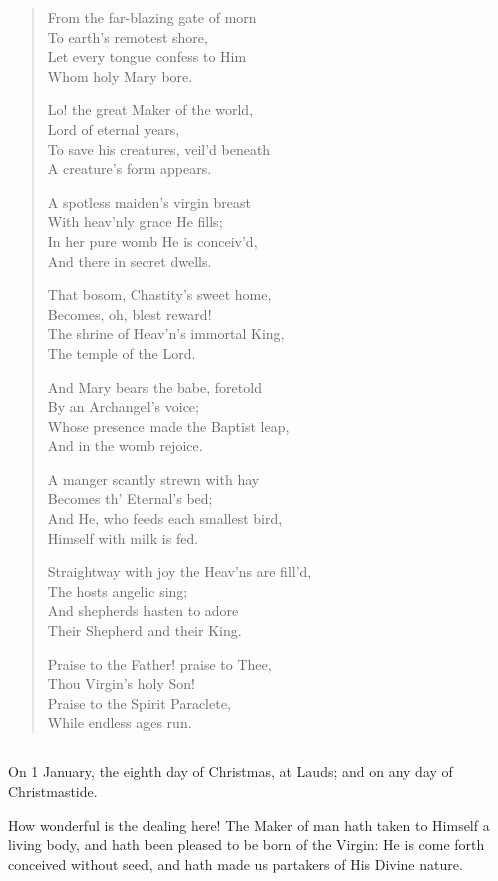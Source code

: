 \begin{verse}
From the far-blazing gate of morn \\
To earth's remotest shore, \\
Let every tongue confess to Him \\
Whom holy Mary bore.

Lo! the great Maker of the world, \\
Lord of eternal years, \\
To save his creatures, veil'd beneath \\
A creature's form appears.

A spotless maiden's virgin breast \\
With heav'nly grace He fills; \\
In her pure womb He is conceiv'd, \\
And there in secret dwells.

That bosom, Chastity's sweet home, \\
Becomes, oh, blest reward! \\
The shrine of Heav'n's immortal King, \\
The temple of the Lord.

And Mary bears the babe, foretold \\
By an Archangel's voice; \\
Whose presence made the Baptist leap, \\
And in the womb rejoice.

A manger scantly strewn with hay \\
Becomes th' Eternal's bed; \\
And He, who feeds each smallest bird, \\
Himself with milk is fed.

Straightway with joy the Heav'ns are fill'd, \\
The hosts angelic sing; \\
And shepherds hasten to adore \\
Their Shepherd and their King.

Praise to the Father! praise to Thee, \\
Thou Virgin's holy Son! \\
Praise to the Spirit Paraclete, \\
While endless ages run.
\end{verse}

\subsection{}

On 1 January, the eighth day of Christmas, at Lauds; and on any day of
Christmastide.

\noindent{}\par
\medskip

\noindent How wonderful is the dealing here! The Maker of man hath taken to Himself a living body, and hath been pleased to be born of the Virgin: He is come forth conceived without seed, and hath made us partakers of His Divine nature.\par
